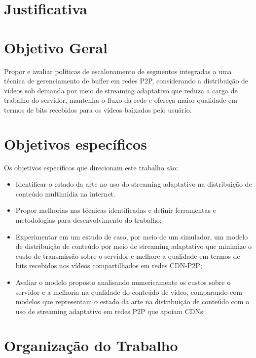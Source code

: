 \documentclass[
	12pt,				%
	oneside,			%
	a4paper,			%
	english,			%
	brazil				%
	]{abntex2ppgsi}
\begin{document}
\section{Justificativa}


\section{Objetivo Geral}

Propor e avaliar políticas de escalonamento de segmentos integradas a uma técnica de gerenciamento de buffer em redes P2P, considerando a distribuição de vídeos sob demanda por meio de streaming adaptativo que reduza a carga de trabalho do servidor, mantenha o fluxo da rede e ofereça maior qualidade em termos de bits recebidos para os vídeos baixados pelo usuário.


\section{Objetivos específicos}

Os objetivos específicos que direcionam este trabalho são:

\begin{itemize}
\item	Identificar o estado da arte no uso do streaming adaptativo na distribuição de conteúdo multimídia na internet.
\item 	Propor melhorias nas técnicas identificadas e definir ferramentas e metodologias para desenvolvimento do trabalho;
\item 	Experimentar em um estudo de caso, por meio de um simulador, um modelo de distribuição de conteúdo por meio de streaming adaptativo que minimize o custo de transmissão sobre o servidor e melhore a qualidade em termos de bits recebidos nos vídeos compartilhados em redes CDN-P2P;
\item 	Avaliar o modelo proposto analisando numericamente os custos sobre o servidor e a melhoria na qualidade do conteúdo de vídeo, comparando com modelos que representam o estado da arte na distribuição de conteúdo com o uso de streaming adaptativo em redes P2P que apoiam CDNs;
\end{itemize}

\section{Organização do Trabalho}
\end{document}

